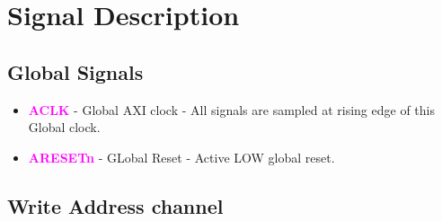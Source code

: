 \documentclass{article}
\newcommand{\AXISignals}[1]{\textbf{\textcolor{magenta}{#1}}}
\begin{document}
\section{Signal Description}
\subsection{Global Signals}
\begin{itemize}
    \item \AXISignals{ACLK} - Global AXI clock - All signals are sampled at rising edge of this Global clock.
    \item \AXISignals{ARESETn} - GLobal Reset - Active LOW global reset.
\end{itemize}

\subsection{Write Address channel}
\end{document}
